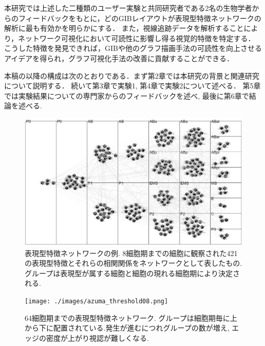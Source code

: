 \documentclass{kuee}
\begin{document}
本研究では上述した二種類のユーザー実験と共同研究者である2名の生物学者からのフィードバックをもとに，どのGIBレイアウトが表現型特徴ネットワークの解析に最も有効かを明らかにする．
また，視線追跡データを解析することにより，ネットワーク可視化において可読性に影響し得る視覚的特徴を特定する．
こうした特徴を発見できれば，GIBや他のグラフ描画手法の可読性を向上させるアイデアを得られ，グラフ可視化手法の改善に貢献することができる．

本稿の以降の構成は次のとおりである．まず第2章では本研究の背景と関連研究について説明する．
続いて第3章で実験1, 第4章で実験2について述べる．
第5章では実験結果についての専門家からのフィードバックを述べ, 最後に第6章で結論を述べる.



\begin{figure}
  \centering
  \includegraphics[width=15cm]{./images/PhenotypeNet.png}
  \caption{表現型特徴ネットワークの例. 8細胞期までの細胞に観察された421の表現型特徴とそれらの相関関係をネットワークとして表したもの. グループは表現型が属する細胞と細胞の現れる細胞期により決定される. \label{fig:example_phenotype}}
\end{figure}

\begin{figure}
  \centering
  \texttt{[image: ./images/azuma\_threshold08.png]}
  \caption{64細胞期までの表現型特徴ネットワーク. グループは細胞期毎に上から下に配置されている.発生が進むにつれグループの数が増え, エッジの密度が上がり視認が難しくなる. \label{fig:64-origin-layout}}
\end{figure}
\end{document}
